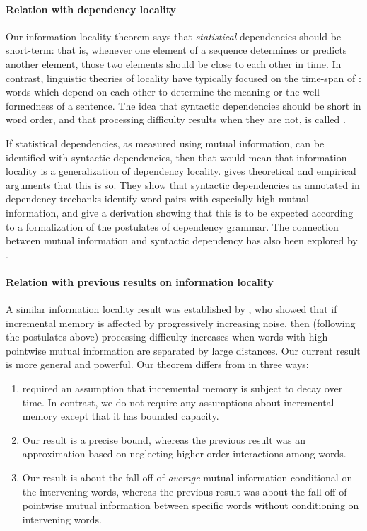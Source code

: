 \paragraph{Relation with dependency locality}
Our information locality theorem says that \emph{statistical} dependencies should be short-term: that is, whenever one element of a sequence determines or predicts another element, those two elements should be close to each other in time. In contrast, linguistic theories of locality have typically focused on the time-span of : words which depend on each other to determine the meaning or the well-formedness of a sentence. The idea that syntactic dependencies should be short in word order, and that processing difficulty results when they are not, is called . 

If statistical dependencies, as measured using mutual information, can be identified with syntactic dependencies, then that would mean that information locality is a generalization of dependency locality. \citet{futrell2019syntactic} gives theoretical and empirical arguments that this is so. They show that syntactic dependencies as annotated in dependency treebanks identify word pairs with especially high mutual information, and give a derivation showing that this is to be expected according to a formalization of the postulates of dependency grammar. The connection between mutual information and syntactic dependency has also been explored by \citet{}. 

\paragraph{Relation with previous results on information locality} A similar information locality result was established by \citet{futrell-noisy-context-2017}, who showed that if incremental memory is affected by progressively increasing noise, then (following the postulates above) processing difficulty increases when words with high pointwise mutual information are separated by large distances. Our current result is more general and powerful. Our theorem differs from \citet{futrell-noisy-context-2017} in three ways:
\begin{enumerate}
    \item \citet{futrell-noisy-context-2017} required an assumption that incremental memory is subject to decay over time. In contrast, we do not require any assumptions about incremental memory except that it has bounded capacity.
    \item Our result is a precise bound, whereas the previous result was an approximation based on neglecting higher-order interactions among words.
    \item Our result is about the fall-off of \emph{average} mutual information conditional on the intervening words, whereas the previous result was about the fall-off of pointwise mutual information between specific words without conditioning on intervening words.
\end{enumerate}

